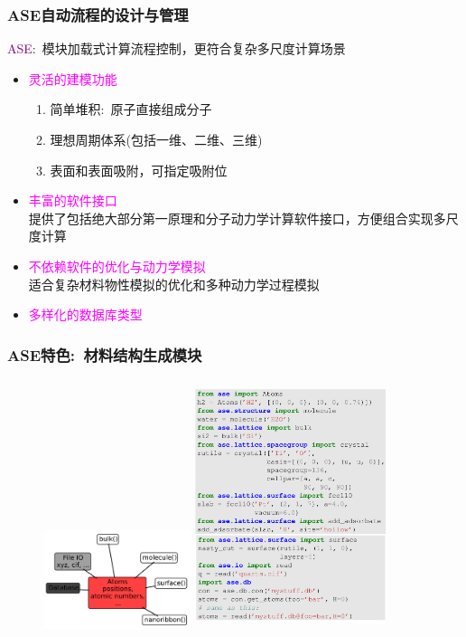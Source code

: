 \frame
{
	\frametitle{\textrm{ASE}自动流程的设计与管理}
		\textcolor{purple}{\textrm{ASE}}:~模块加载式计算流程控制，更符合复杂多尺度计算场景
		\begin{itemize}
			\item \textcolor{magenta}{灵活的建模功能}
				\begin{enumerate}
    \setlength{\itemsep}{10pt}
					\item 简单堆积:~原子直接组成分子
					\item 理想周期体系(包括一维、二维、三维)
					\item 表面和表面吸附，可指定吸附位
				\end{enumerate}
			\item \textcolor{magenta}{丰富的软件接口}\\
				提供了包括绝大部分第一原理和分子动力学计算软件接口，方便组合实现多尺度计算
			\item \textcolor{magenta}{不依赖软件的优化与动力学模拟}\\
				适合复杂材料物性模拟的优化和多种动力学过程模拟
			\item \textcolor{magenta}{多样化的数据库类型}
		\end{itemize} 
}

\frame
{
\frametitle{\textrm{ASE}特色:~材料结构生成模块}
\begin{figure}[h!]
\centering
\vspace*{-0.15in}
\includegraphics[height=1.2in,width=1.7in,viewport=0 0 820 530,clip]{Figures/ASE_atoms_module.png}
\includegraphics[height=2.9in,width=2.2in,viewport=0 0 970 1200,clip]{Figures/ASE_atoms_module-examples.png}
\label{Logo_atoms-module}
\end{figure} 
}

